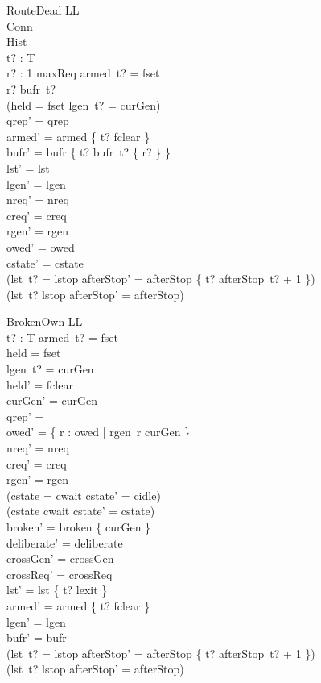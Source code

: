 \documentclass[a4paper,10pt,fleqn]{article}
\begin{document}
\begin{schema}{RouteDead}
  \Delta LL \\
  \Xi Conn \\
  \Xi Hist \\
  t? : T \\
  r? : 1 \upto maxReq
\where
  armed~t? = fset \\
  r? \in bufr~t? \\
  \lnot (held = fset \land lgen~t? = curGen) \\
  qrep' = qrep \\
  armed' = armed \oplus \{ t? \mapsto fclear \} \\
  bufr' = bufr \oplus \{ t? \mapsto bufr~t? \setminus \{ r? \} \} \\
  lst' = lst \\
  lgen' = lgen \\
  nreq' = nreq \\
  creq' = creq \\
  rgen' = rgen \\
  owed' = owed \\
  cstate' = cstate \\
  (lst~t? = lstop \implies
    afterStop' = afterStop \oplus \{ t? \mapsto afterStop~t? + 1 \}) \\
  (lst~t? \neq lstop \implies afterStop' = afterStop)
\end{schema}

\begin{schema}{BrokenOwn}
  \Delta LL \\
  t? : T
\where
  armed~t? = fset \\
  held = fset \\
  lgen~t? = curGen \\
  held' = fclear \\
  curGen' = curGen \\
  qrep' = \emptyset \\
  owed' = \{ r : owed | rgen~r \neq curGen \} \\
  nreq' = nreq \\
  creq' = creq \\
  rgen' = rgen \\
  (cstate = cwait \implies cstate' = cidle) \\
  (cstate \neq cwait \implies cstate' = cstate) \\
  broken' = broken \cup \{ curGen \} \\
  deliberate' = deliberate \\
  crossGen' = crossGen \\
  crossReq' = crossReq \\
  lst' = lst \oplus \{ t? \mapsto lexit \} \\
  armed' = armed \oplus \{ t? \mapsto fclear \} \\
  lgen' = lgen \\
  bufr' = bufr \\
  (lst~t? = lstop \implies
    afterStop' = afterStop \oplus \{ t? \mapsto afterStop~t? + 1 \}) \\
  (lst~t? \neq lstop \implies afterStop' = afterStop)
\end{schema}
\end{document}
